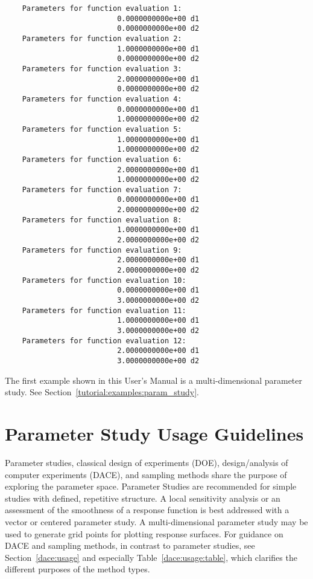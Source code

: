 \begin{small}
\begin{verbatim}
    Parameters for function evaluation 1:
                          0.0000000000e+00 d1   
                          0.0000000000e+00 d2   
    Parameters for function evaluation 2:
                          1.0000000000e+00 d1   
                          0.0000000000e+00 d2   
    Parameters for function evaluation 3:
                          2.0000000000e+00 d1   
                          0.0000000000e+00 d2   
    Parameters for function evaluation 4:
                          0.0000000000e+00 d1   
                          1.0000000000e+00 d2   
    Parameters for function evaluation 5:
                          1.0000000000e+00 d1   
                          1.0000000000e+00 d2   
    Parameters for function evaluation 6:
                          2.0000000000e+00 d1   
                          1.0000000000e+00 d2   
    Parameters for function evaluation 7:
                          0.0000000000e+00 d1   
                          2.0000000000e+00 d2   
    Parameters for function evaluation 8:
                          1.0000000000e+00 d1   
                          2.0000000000e+00 d2   
    Parameters for function evaluation 9:
                          2.0000000000e+00 d1   
                          2.0000000000e+00 d2   
    Parameters for function evaluation 10:
                          0.0000000000e+00 d1   
                          3.0000000000e+00 d2   
    Parameters for function evaluation 11:
                          1.0000000000e+00 d1   
                          3.0000000000e+00 d2   
    Parameters for function evaluation 12:
                          2.0000000000e+00 d1   
                          3.0000000000e+00 d2
\end{verbatim}
\end{small}

The first example shown in this User's Manual is a multi-dimensional
parameter study. See Section~\ref{tutorial:examples:param_study}.

\section{Parameter Study Usage Guidelines}\label{ps:usage}

Parameter studies, classical design of experiments (DOE),
design/analysis of computer experiments (DACE), and sampling methods
share the purpose of exploring the parameter space.  Parameter Studies
are recommended for simple studies with defined, repetitive structure.
A local sensitivity analysis or an assessment of the
smoothness of a response function is best addressed with a vector or
centered parameter study. A multi-dimensional parameter 
study may be used to generate grid points for plotting response surfaces.
For guidance on DACE and sampling methods, in contrast to parameter 
studies, see Section~\ref{dace:usage} and especially Table~\ref{dace:usage:table},
which clarifies the different purposes of the method types.
 
